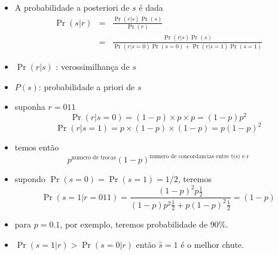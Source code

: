 \begin{frame}[allowframebreaks]
\begin{example}
  \examplebreak

        \begin{itemize}
	\item A probabilidade a posteriori de $s$ é dada
		\begin{eqnarray}
		\Pr(s|r) &=& \frac{\Pr(r|s) \Pr(s)}{\Pr(r)} \nonumber \\
			&=& \frac{\Pr(r|s) \Pr(s)}{ \Pr(r | s=0)\Pr(s=0) + \Pr(r | s=1)\Pr(s=1)}
		\end{eqnarray}
	\item $\Pr(r|s)$ : verossimilhança de $s$
	\item $P(s)$: probabilidade a priori de $s$
	\end{itemize}
 
  \examplebreak

	\begin{itemize}
	\item suponha $r=011$
		\begin{equation}
		\Pr(r | s = 0) = (1-p)\times p \times p = (1-p) p^2
		\end{equation}
		\begin{equation}
                \Pr(r | s = 1) = p \times (1-p) \times (1-p) = p(1-p)^2
                \end{equation}
	\item temos então
		\begin{equation}
		p^{\text{numero de trocas}} (1-p)^{\text{numero de concordancias entre t(s) e r}}
		\end{equation}
	\end{itemize}

  \examplebreak

        \begin{itemize}
	\item supondo $\Pr(s=0) = \Pr(s=1) = 1/2$, teremos
		\begin{equation}
		\Pr(s=1 | r =011) = \frac{ (1-p)^2 p \frac{1}{2} }{ (1-p)p^2 \frac{1}{2} + p(1-p)^2 \frac{1}{2} } = (1-p)
		\end{equation}
	\item para $p = 0.1$, por exemplo, teremos probabilidade de 90\%.
	\item $\Pr(s=1 | r) > \Pr(s=0 | r)$ então $\hat{s}=1$ é o melhor chute. 
	\end{itemize}


  \end{example}

\end{frame}


